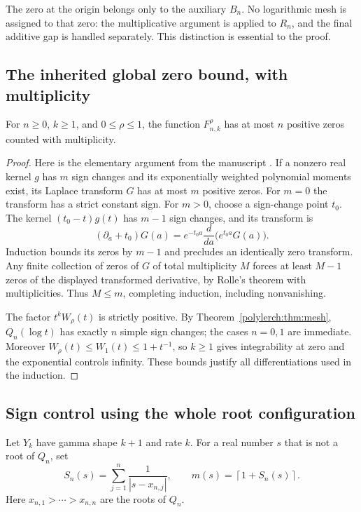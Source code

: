 The zero at the origin belongs only to the auxiliary $B_n$. No
logarithmic mesh is assigned to that zero: the multiplicative argument
is applied to $R_n$, and the final additive gap is handled separately.
This distinction is essential to the proof.

\subsection{The inherited global zero bound, with multiplicity}

\begin{lemma}\label{polylerch:lem:variation}
For $n\ge0$, $k\ge1$, and $0\le\rho\le1$, the function
$F_{n,k}^{\rho}$ has at most $n$ positive zeros counted with multiplicity.
\end{lemma}
\begin{proof}
Here is the elementary argument from the manuscript
\cite[\texttt{zeros:lem:variation}]{baseline}. If a nonzero real
kernel $g$ has $m$ sign changes and its exponentially weighted
polynomial moments exist, its Laplace transform $G$ has at most
$m$ positive zeros. For $m=0$ the transform has a strict constant
sign. For $m>0$, choose a sign-change point $t_0$.
The kernel $(t_0-t)g(t)$ has $m-1$ sign changes, and its transform is
\[
 (\partial_a+t_0)G(a)
   =e^{-t_0a}\frac{d}{da}\bigl(e^{t_0a}G(a)\bigr).
\]
Induction bounds its zeros by $m-1$ and precludes an identically
zero transform. Any finite collection of zeros of $G$ of total
multiplicity $M$ forces at least $M-1$ zeros of the displayed
transformed derivative, by Rolle's theorem with multiplicities.
Thus $M\le m$, completing induction, including nonvanishing.

The factor $t^kW_\rho(t)$ is strictly positive. By
Theorem~\ref{polylerch:thm:mesh}, $Q_n(\log t)$ has exactly $n$
simple sign changes; the cases $n=0,1$ are immediate.
Moreover $W_\rho(t)\le W_1(t)\le1+t^{-1}$, so $k\ge1$ gives
integrability at zero and the exponential controls infinity.
These bounds justify all differentiations used in the induction.
\end{proof}

\subsection{Sign control using the whole root configuration}

Let $Y_k$ have gamma shape $k+1$ and rate $k$. For a real number $s$
that is not a root of $Q_n$, set
\[
 S_n(s)=\sum_{j=1}^n\frac1{|s-x_{n,j}|},
 \qquad m(s)=\left\lceil1+S_n(s)\right\rceil.
\]
Here $x_{n,1}>\cdots>x_{n,n}$ are the roots of $Q_n$.

